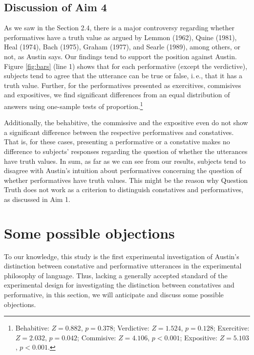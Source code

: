 \documentclass[egregdoesnotlikesansseriftitles,12pt]{scrartcl}
\begin{document}
\subsection{Discussion of Aim 4}
As we saw in the Section 2.4, there is a major controversy regarding whether performatives have a truth value as argued by Lemmon (1962), Quine (1981), Heal (1974), Bach (1975), Graham (1977), and Searle (1989), among others, or not, as Austin says. Our findings tend to support the position against Austin. Figure \ref{fig:bars} (line 1) shows that for each performative (except the verdictive), subjects tend to agree that the utterance can be true or false, i.\,e., that it has a truth value. Further, for the performatives presented as exercitives, commisives and expositives, we find significant differences from an equal distribution of answers using one-sample tests of proportion.\footnote{Behabitive: $Z=0.882$, $p=0.378$; Verdictive: $Z=1.524$, $p=0.128$; Exercitive: $Z=2.032$, $p=0.042$; Commisive: $Z=4.106$, $p<0.001$; Expositive: $Z=5.103$, $p<0.001$.}

Additionally, the behabitive, the commissive and the expositive even do not show a significant difference between the respective performatives and constatives. That is, for these cases, presenting a performative or a constative makes no difference to subjects' responses regarding the question of whether the utterances have truth values. In sum, as far as we can see from our results, subjects tend to disagree with Austin's intuition about performatives concerning the question of whether performatives have truth values. This might be the reason why Question Truth does not work as a criterion to distinguish constatives and performatives, as discussed in Aim 1.

\section{Some possible objections}\label{sec:objections}
To our knowledge, this study is the first experimental investigation of Austin's distinction between constative and performative utterances in the experimental philosophy of language. Thus, lacking a generally accepted standard of the experimental design for investigating the distinction between constatives and performative, in this section, we will anticipate and discuss some possible objections. \\
\end{document}
